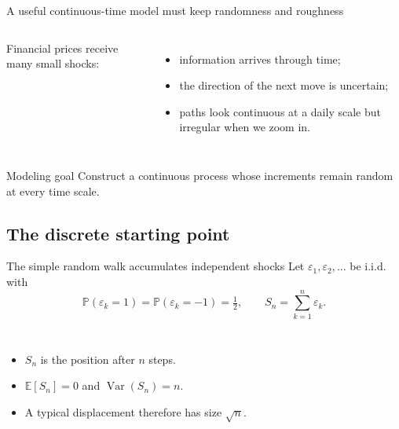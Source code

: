 \documentclass[10pt,aspectratio=169]{beamer}
\newcommand{\E}{\mathbb E}
\newcommand{\Pp}{\mathbb P}
\begin{document}
\begin{frame}{A useful continuous-time model must keep randomness and roughness}
\begin{columns}[T,onlytextwidth]
Financial prices receive many small shocks:
\begin{itemize}
  \item information arrives through time;
  \item the direction of the next move is uncertain;
  \item paths look continuous at a daily scale but irregular when we zoom in.
\end{itemize}

\centering
{}
\end{columns}
\begin{block}{Modeling goal}
Construct a continuous process whose increments remain random at every time scale.
\end{block}
\end{frame}

\subsection{The discrete starting point}

\begin{frame}{The simple random walk accumulates independent shocks}
Let \(\varepsilon_1,\varepsilon_2,\ldots\) be i.i.d. with
\[
\Pp(\varepsilon_k=1)=\Pp(\varepsilon_k=-1)=\tfrac12,
\qquad
S_n=\sum_{k=1}^{n}\varepsilon_k.
\]
\begin{columns}[T,onlytextwidth]
\begin{itemize}
  \item \(S_n\) is the position after \(n\) steps.
  \item \(\E[S_n]=0\) and \(\operatorname{Var}(S_n)=n\).
  \item A typical displacement therefore has size \(\sqrt n\).
\end{itemize}
\centering
{}
\end{columns}
\end{frame}
\end{document}
